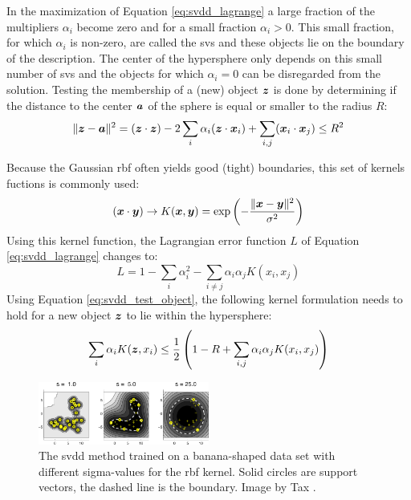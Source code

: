 In the maximization of Equation \ref{eq:svdd_lagrange} a large fraction of the multipliers $\alpha_i$ become zero and for a small fraction $\alpha_i > 0$.
This small fraction, for which $\alpha_i$ is non-zero, are called the \glspl{sv} and these objects lie on the boundary of the description.
The center of the hypersphere only depends on this small number of \glspl{sv} and the objects for which $\alpha_i = 0$ can be disregarded from the solution.
Testing the membership of a (new) object $\vectorsym{z}$ is done by determining if the distance to the center $\vectorsym{a}$ of the sphere is equal or smaller to the radius $R$:
\begin{equation}\label{eq:svdd_test_object}
  \lVert \vectorsym{z} - \vectorsym{a} \rVert ^2 = (\vectorsym{z} \cdot \vectorsym{z}) - 2 \sum_{i} \alpha_i(\vectorsym{z} \cdot \vectorsym{x}_i) + \sum_{i,j}(\vectorsym{x}_i \cdot \vectorsym{x}_j) \le R^2
\end{equation}


Because the Gaussian \gls{rbf} often yields good (\ie tight) boundaries, this set of kernels fuctions is commonly used:
\begin{equation}
  (\vectorsym{x} \cdot \vectorsym{y}) \rightarrow K(\vectorsym{x},\vectorsym{y}) = \operatorname{exp}\left(- \frac{\lVert \vectorsym{x} - \vectorsym{y} \rVert ^2}{\sigma^2}\right)
\end{equation}
Using this kernel function, the Lagrangian error function $L$ of Equation \ref{eq:svdd_lagrange} changes to:
\begin{equation}\label{eq:svdd_lagrange_kernel}
  L = 1 - \sum_{i} \alpha_i^2 - \sum_{i \ne j} \alpha_i \alpha_j K(x_i, x_j)
\end{equation}
Using Equation \ref{eq:svdd_test_object}, the following kernel formulation needs to hold for a new object $\vectorsym{z}$ to lie within the hypersphere:
\begin{equation}\label{eq:svdd_inequality}
  \sum_{i} \alpha_i K(\vectorsym{z}, x_i) \le \frac{1}{2} \left( 1 - R + \sum_{i,j} \alpha_i \alpha_j K(x_i, x_j) \right)
\end{equation}

\begin{figure}
  \centering
    \includegraphics[width=0.5\textwidth,keepaspectratio]{./Figures/chapter3/svdd-boundary.pdf}
  \caption[\gls{svdd} boundary]{The \gls{svdd} method trained on a banana-shaped data set with different sigma-values for the \gls{rbf} kernel. Solid circles are support vectors, the dashed line is the boundary. Image by Tax \cite{tax2001one}.}
  \label{fig:svdd-boundary}
\end{figure}

